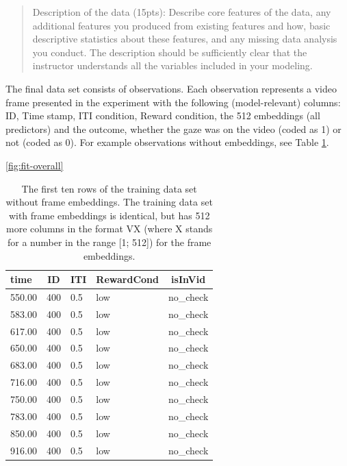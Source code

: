 \documentclass[
  man,floatsintext]{apa6}
\begin{document}
\begin{quote}
Description of the data (15pts): Describe core features of the data, any additional features you produced from existing features and how, basic descriptive statistics about these features, and any missing data analysis you conduct. The description should be sufficiently clear that the instructor understands all the variables included in your modeling.
\end{quote}

The final data set consists of observations. Each observation represents a video frame presented in the experiment with the following (model-relevant) columns: ID, Time stamp, ITI condition, Reward condition, the 512 embeddings (all predictors) and the outcome, whether the gaze was on the video (coded as 1) or not (coded as 0). For example observations without embeddings, see Table \ref{tab:datatable}.

\ref{fig:fit-overall}

\begin{table}[tbp]

\begin{center}
\begin{threeparttable}

\caption{\label{tab:datatable}The first ten rows of the training data set without frame embeddings. The training data set with frame embeddings is identical, but has 512 more columns in the format VX (where X stands for a number in the range [1; 512]) for the frame embeddings.}

\begin{tabular}{lllll}
\toprule
time & \multicolumn{1}{c}{ID} & \multicolumn{1}{c}{ITI} & \multicolumn{1}{c}{RewardCond} & \multicolumn{1}{c}{isInVid}\\
\midrule
550.00 & 400 & 0.5 & low & no\_check\\
583.00 & 400 & 0.5 & low & no\_check\\
617.00 & 400 & 0.5 & low & no\_check\\
650.00 & 400 & 0.5 & low & no\_check\\
683.00 & 400 & 0.5 & low & no\_check\\
716.00 & 400 & 0.5 & low & no\_check\\
750.00 & 400 & 0.5 & low & no\_check\\
783.00 & 400 & 0.5 & low & no\_check\\
850.00 & 400 & 0.5 & low & no\_check\\
916.00 & 400 & 0.5 & low & no\_check\\
\bottomrule
\end{tabular}

\end{threeparttable}
\end{center}

\end{table}
\end{document}
